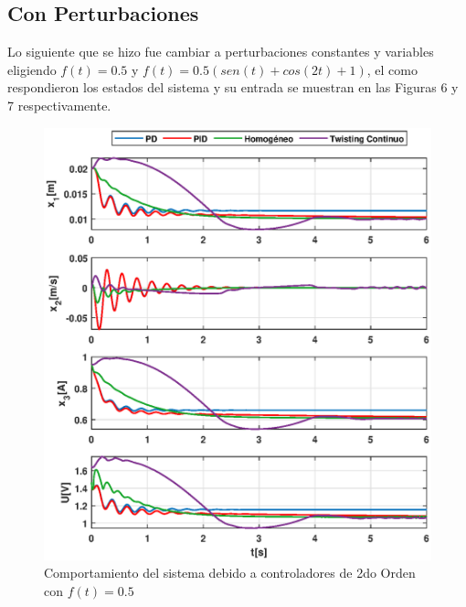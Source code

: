 \documentclass[onecolumn,10pt]{article}
\begin{document}
\subsection*{Con Perturbaciones}
Lo siguiente que se hizo fue cambiar a perturbaciones constantes y variables eligiendo $f(t)=0.5$ y $f(t)=0.5(sen(t)+cos(2t)+1)$, el como respondieron los estados del sistema y su entrada se muestran en las Figuras 6 y 7 respectivamente.
\begin{figure}[!h]
\centering
\includegraphics[scale=0.55]{xu_3o_c2o_pc.eps}
\caption{Comportamiento del sistema debido a controladores de 2do Orden con  $f(t)=0.5$}
\end{figure}
\\
\\
\\
\\
\\
\\
\\
\\
\\
\\
\\
\\
\\
\\
\end{document}
